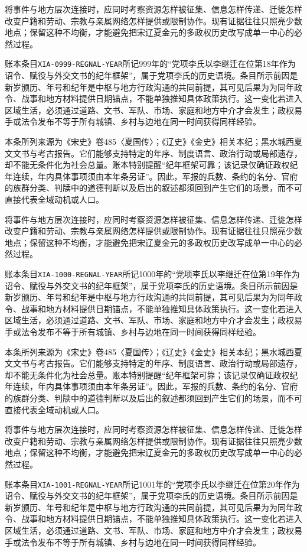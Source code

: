 将事件与地方层次连接时，应同时考察资源怎样被征集、信息怎样传递、迁徙怎样改变户籍和劳动、宗教与亲属网络怎样提供或限制协作。现有证据往往只照亮少数地点；保留这种不均衡，才能避免把宋辽夏金元的多政权历史改写成单一中心的必然过程。

账本条目\texttt{XIA-0999-REGNAL-YEAR}所记999年的“党项李氏以李继迁在位第18年作为诏令、赋役与外交文书的纪年框架”，属于党项李氏的历史语境。条目所示前因是新岁颁历、年号和纪年是中枢与地方行政沟通的共同前提，其可见后果为为同年政令、战事和地方材料提供日期锚点，不能单独推知具体政策执行。这一变化若进入区域生活，必须通过道路、文书、军队、市场、家庭和地方中介才会发生；政权易手或法令发布不等于所有城镇、乡村与边地在同一时间获得同样经验。

本条所列来源为《宋史》卷485〈夏国传〉；《辽史》《金史》相关本纪；黑水城西夏文文书与考古报告。它们能够支持特定的年序、制度语言、政治行动或局部遗存，却不能无条件化为社会总量。账本特别提醒“纪年框架可靠；该记录仅确证政权纪年连续，年内具体事项须由本年条另证”。因此，军报的兵数、条约的名分、官府的族群分类、判牍中的道德判断以及后出的叙述都须回到产生它们的场景，而不可直接代表全域动机或人口。

将事件与地方层次连接时，应同时考察资源怎样被征集、信息怎样传递、迁徙怎样改变户籍和劳动、宗教与亲属网络怎样提供或限制协作。现有证据往往只照亮少数地点；保留这种不均衡，才能避免把宋辽夏金元的多政权历史改写成单一中心的必然过程。

账本条目\texttt{XIA-1000-REGNAL-YEAR}所记1000年的“党项李氏以李继迁在位第19年作为诏令、赋役与外交文书的纪年框架”，属于党项李氏的历史语境。条目所示前因是新岁颁历、年号和纪年是中枢与地方行政沟通的共同前提，其可见后果为为同年政令、战事和地方材料提供日期锚点，不能单独推知具体政策执行。这一变化若进入区域生活，必须通过道路、文书、军队、市场、家庭和地方中介才会发生；政权易手或法令发布不等于所有城镇、乡村与边地在同一时间获得同样经验。

本条所列来源为《宋史》卷485〈夏国传〉；《辽史》《金史》相关本纪；黑水城西夏文文书与考古报告。它们能够支持特定的年序、制度语言、政治行动或局部遗存，却不能无条件化为社会总量。账本特别提醒“纪年框架可靠；该记录仅确证政权纪年连续，年内具体事项须由本年条另证”。因此，军报的兵数、条约的名分、官府的族群分类、判牍中的道德判断以及后出的叙述都须回到产生它们的场景，而不可直接代表全域动机或人口。

将事件与地方层次连接时，应同时考察资源怎样被征集、信息怎样传递、迁徙怎样改变户籍和劳动、宗教与亲属网络怎样提供或限制协作。现有证据往往只照亮少数地点；保留这种不均衡，才能避免把宋辽夏金元的多政权历史改写成单一中心的必然过程。

账本条目\texttt{XIA-1001-REGNAL-YEAR}所记1001年的“党项李氏以李继迁在位第20年作为诏令、赋役与外交文书的纪年框架”，属于党项李氏的历史语境。条目所示前因是新岁颁历、年号和纪年是中枢与地方行政沟通的共同前提，其可见后果为为同年政令、战事和地方材料提供日期锚点，不能单独推知具体政策执行。这一变化若进入区域生活，必须通过道路、文书、军队、市场、家庭和地方中介才会发生；政权易手或法令发布不等于所有城镇、乡村与边地在同一时间获得同样经验。

